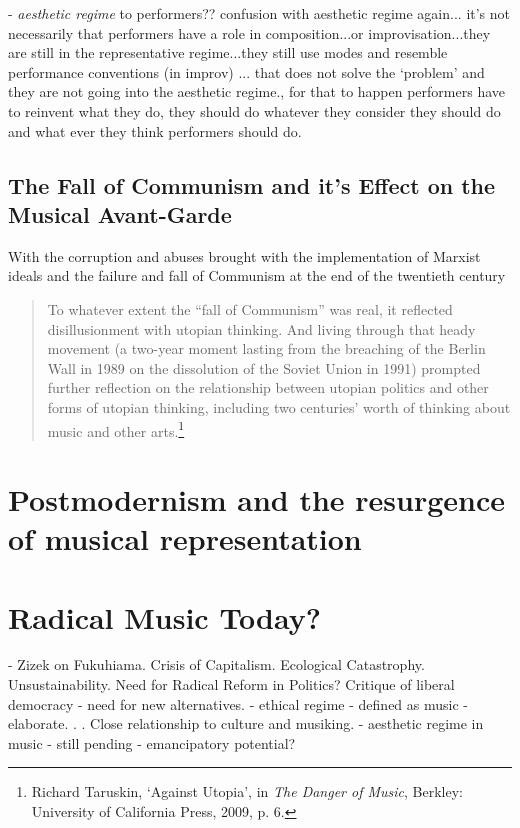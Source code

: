 - \emph{aesthetic regime} to performers?? confusion with aesthetic regime again... it's not necessarily that performers have a role in composition...or improvisation...they are still in the representative regime...they still use modes and resemble performance conventions (in improv) ... that does not solve the `problem' and they are not going into the aesthetic regime., for that to happen performers have to reinvent what they do, they should do whatever they consider they should do and what ever they think performers should do.



\subsection{The Fall of Communism and it's Effect on the Musical Avant-Garde}

With the corruption and abuses brought with the implementation of Marxist ideals and the failure and fall of Communism at the end of the twentieth century

\begin{quote}
To whatever extent the ``fall of Communism'' was real, it reflected disillusionment with utopian thinking. And living through that heady movement (a two-year moment lasting from the breaching of the Berlin Wall in 1989 on the dissolution of the Soviet Union in 1991) prompted further reflection on the relationship between utopian politics and other forms of utopian thinking, including two centuries' worth of thinking about music and other arts.\footnote{Richard Taruskin, `Against Utopia', in \emph{The Danger of Music}, Berkley: University of California Press, 2009, p. 6.}
\end{quote}


\section{Postmodernism and the resurgence of musical representation}

\section{Radical Music Today?}

- Zizek on Fukuhiama. Crisis of Capitalism. Ecological Catastrophy. Unsustainability. Need for Radical Reform in Politics? Critique of liberal democracy - need for new alternatives.
- ethical regime - defined as music - elaborate. . . Close relationship to culture and musiking.
- aesthetic regime in music - still pending - emancipatory potential?


\label{ch:introduction}